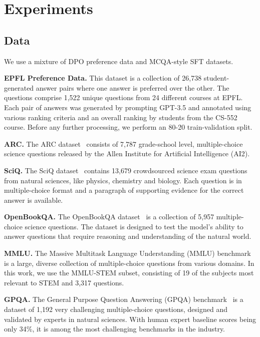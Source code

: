 \section{Experiments}\label{sec:experiments}
\subsection{Data}\label{subsec:data}


We use a mixture of DPO preference data and MCQA-style SFT datasets.

\textbf{EPFL Preference Data.} This dataset is a collection of 26,738
student-generated answer pairs where one answer is preferred over the other. 
The questions comprise 1,522 unique questions from 24 different courses at
EPFL. Each pair of answers was generated by prompting GPT-3.5 and annotated
using various ranking criteria and an overall ranking by students from the
CS-552 course. Before any further processing, we perform an 80-20
train-validation split.

\textbf{ARC.} The ARC dataset~\cite{arc} consists of 7,787 grade-school
level, multiple-choice science questions released by the Allen Institute for
Artificial Intelligence (AI2). 

\textbf{SciQ.} The SciQ dataset~\cite{sciq} contains 13,679
crowdsourced science exam questions from natural sciences, like physics,
chemistry and biology. Each question is in multiple-choice format and a paragraph of supporting
evidence for the correct answer is available.

\textbf{OpenBookQA.} The OpenBookQA dataset~\cite{openbookqa} is a collection of
5,957 multiple-choice science questions. The dataset is designed to test the
model's ability to answer questions that require reasoning and understanding of
the natural world.

\textbf{MMLU.} The Massive Multitask Language Understanding (MMLU)
benchmark~\cite{mmlu} is a large, diverse collection of multiple-choice
questions from various domains. In this work, we use the MMLU-STEM subset,
consisting of 19 of the subjects most relevant to STEM and 3,317 questions. 

\textbf{GPQA.} The General Purpose Question Answering (GPQA)
benchmark~\cite{gpqa} is a dataset of 1,192 very challenging
multiple-choice questions, designed and validated by experts in natural
sciences. With human expert baseline scores being only 34\%, it is among the
most challenging benchmarks in the industry.

